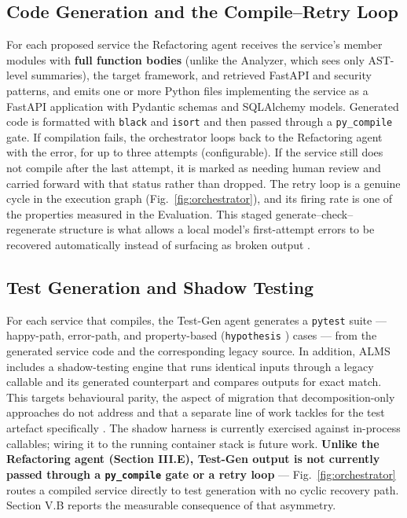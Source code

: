 \documentclass[conference]{IEEEtran}
\begin{document}
\subsection{Code Generation and the Compile--Retry Loop}

For each proposed service the Refactoring agent receives the service's member modules with \textbf{full function bodies} (unlike the Analyzer, which sees only AST-level summaries), the target framework, and retrieved FastAPI and security patterns, and emits one or more Python files implementing the service as a FastAPI application with Pydantic schemas and SQLAlchemy models. Generated code is formatted with \texttt{black} and \texttt{isort} and then passed through a \texttt{py\_compile} gate. If compilation fails, the orchestrator loops back to the Refactoring agent with the error, for up to three attempts (configurable). If the service still does not compile after the last attempt, it is marked as needing human review and carried forward with that status rather than dropped. The retry loop is a genuine cycle in the execution graph (Fig.~\ref{fig:orchestrator}), and its firing rate is one of the properties measured in the Evaluation. This staged generate--check--regenerate structure is what allows a local model's first-attempt errors to be recovered automatically instead of surfacing as broken output \cite{chen2026}.

\subsection{Test Generation and Shadow Testing}

For each service that compiles, the Test-Gen agent generates a \texttt{pytest} suite --- happy-path, error-path, and property-based (\texttt{hypothesis} \cite{maciver2019}) cases --- from the generated service code and the corresponding legacy source. In addition, ALMS includes a shadow-testing engine that runs identical inputs through a legacy callable and its generated counterpart and compares outputs for exact match. This targets behavioural parity, the aspect of migration that decomposition-only approaches do not address \cite{sellami2025,kalia2021} and that a separate line of work tackles for the test artefact specifically \cite{yeh2024}. The shadow harness is currently exercised against in-process callables; wiring it to the running container stack is future work. \textbf{Unlike the Refactoring agent (Section III.E), Test-Gen output is not currently passed through a \texttt{py\_compile} gate or a retry loop} --- Fig.~\ref{fig:orchestrator} routes a compiled service directly to test generation with no cyclic recovery path. Section V.B reports the measurable consequence of that asymmetry.
\end{document}
